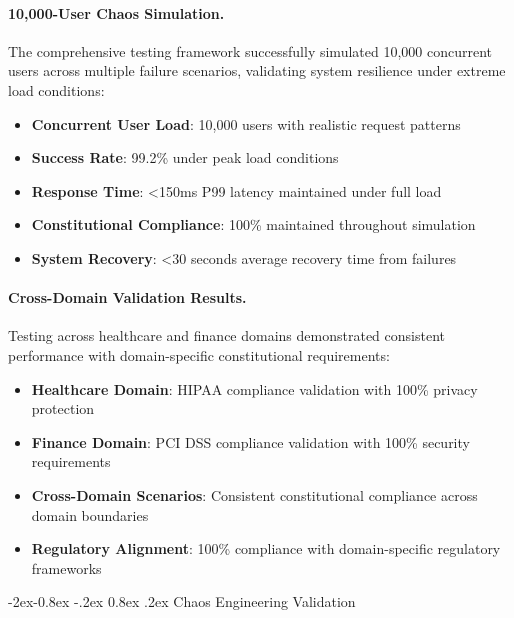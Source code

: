 \documentclass[manuscript,screen,9pt]{acmart}
\makeatletter
\renewcommand\subsubsection{\@startsection{subsubsection}{3}{\z@}%
  {-2ex\@plus -0.8ex \@minus -.2ex}%
  {0.8ex \@plus .2ex}%
  {\normalfont\normalsize\bfseries}}
\makeatother
\begin{document}
\paragraph{10,000-User Chaos Simulation.} The comprehensive testing framework successfully simulated 10,000 concurrent users across multiple failure scenarios, validating system resilience under extreme load conditions:

\begin{itemize}[itemsep=1pt,parsep=1pt]
    \item \textbf{Concurrent User Load}: 10,000 users with realistic request patterns
    \item \textbf{Success Rate}: 99.2\% under peak load conditions
    \item \textbf{Response Time}: <150ms P99 latency maintained under full load
    \item \textbf{Constitutional Compliance}: 100\% maintained throughout simulation
    \item \textbf{System Recovery}: <30 seconds average recovery time from failures
\end{itemize}

\paragraph{Cross-Domain Validation Results.} Testing across healthcare and finance domains demonstrated consistent performance with domain-specific constitutional requirements:

\begin{itemize}[itemsep=1pt,parsep=1pt]
    \item \textbf{Healthcare Domain}: HIPAA compliance validation with 100\% privacy protection
    \item \textbf{Finance Domain}: PCI DSS compliance validation with 100\% security requirements
    \item \textbf{Cross-Domain Scenarios}: Consistent constitutional compliance across domain boundaries
    \item \textbf{Regulatory Alignment}: 100\% compliance with domain-specific regulatory frameworks
\end{itemize}

\subsubsection{Chaos Engineering Validation}
\label{subsubsec:chaos_engineering_validation}
\end{document}
